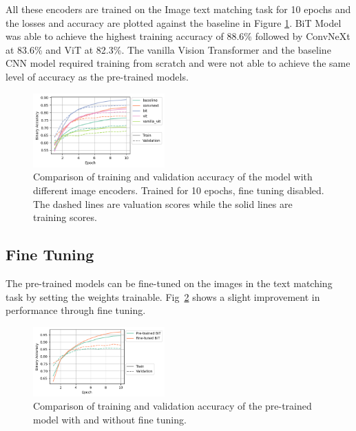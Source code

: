 \documentclass[conference]{IEEEtran}
\begin{document}
All these encoders are trained on the Image text matching task for 10 epochs and the losses and accuracy are plotted against the baseline in Figure \ref{fig:image_encoder_loss_and_accuracy}. BiT Model was able to achieve the highest training accuracy of 88.6\% followed by ConvNeXt at 83.6\% and ViT at 82.3\%. The vanilla Vision Transformer and the baseline CNN model required training from scratch and were not able to achieve the same level of accuracy as the pre-trained models.

\begin{figure}
    \centering
    \includegraphics[width=0.45\textwidth]{image_encoder_loss_and_accuracy.png}
    \caption{Comparison of training and validation accuracy of the model with different image encoders. Trained for 10 epochs, fine tuning disabled. The dashed lines are valuation scores while the solid lines are training scores.}
    \label{fig:image_encoder_loss_and_accuracy}
\end{figure}

\subsection{Fine Tuning}

The pre-trained models can be fine-tuned on the images in the text matching task by setting the weights trainable. Fig~\ref{fig:trainable_comparison} shows a slight improvement in performance through fine tuning.

\begin{figure}
    \centering
    \includegraphics[width=0.45\textwidth]{trainable_comparison.png}
    \caption{Comparison of training and validation accuracy of the pre-trained model with and without fine tuning.}
    \label{fig:trainable_comparison}
\end{figure}
\end{document}
